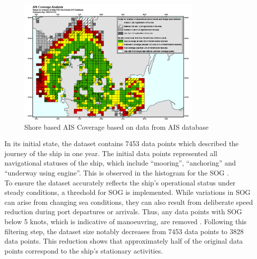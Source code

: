 \begin{figure}
    \centering
        \includegraphics[width=0.8\textwidth]{02_figures/AIS_Coverage.png}
        \caption{Shore based AIS Coverage based on data from AIS database \cite{webaisdk.2023}}
        \label{fig:aiscoverage}
\end{figure}

In its initial state, the dataset contains 7453 data points which described the journey of the ship in one year. The initial data points represented all navigational statuses of the ship, which include ``mooring'', ``anchoring'' and ``underway using engine''. This is observed in the histogram for the SOG .\\ 

To ensure the dataset accurately reflects the ship's operational status under steady conditions, a threshold for SOG is implemented. While variations in SOG can arise from changing sea conditions, they can also result from deliberate speed reduction during port departures or arrivals. Thus, any data points with SOG below 5 knots, which is indicative of manoeuvring, are removed . Following this filtering step, the dataset size notably decreases from 7453 data points to 3828 data points. This reduction shows that approximately half of the original data points correspond to the ship's stationary activities.\\

